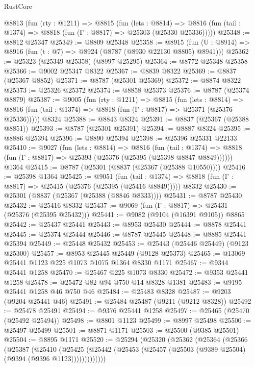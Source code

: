 \begin{lexlean}{RustCore}
\begin{coremodule}
  @8813
    (fun (rty : @1211) =>
    @8815
      (fun (lets : @8814) =>
      @8816 (fun (tail : @1374) => @8818 (fun (Γ : @8817) => @25303 (@25330 @25336)))))
@25348 := @8812 @25347
@25349 := @8809 @25348
@25358 := @8915
    (fun (U : @8914) => @8916 (fun (t : @7) => @8924 (@8787 (@8930 @22130 @8805) @8941)))
@25362 := @25323 (@25349 @25358) (@8997 @25295)
@25364 := @8772 @25348 @25358
@25366 := @9002 @25347 @8322
@25367 := @8839 @8322
@25369 := @8837 (@25367 @8852)
@25371 := @8787 (@25301 @25369)
@25372 := @8874 @8322
@25373 := @25326 @25372
@25374 := @8858 @25373
@25376 := @8787 (@25374 @8879)
@25387 := @9005
    (fun (rty : @1211) =>
    @8815
      (fun (lets : @8814) =>
      @8816 (fun (tail : @1374) => @8818 (fun (Γ : @8817) => @25371 (@25376 @25336)))))
    @8324
@25388 := @8843 @8324
@25391 := @8837 (@25367 (@25388 @8851))
@25393 := @8787 (@25301 @25391)
@25394 := @8887 @8324
@25395 := @8886 @25394
@25396 := @8890 @25394
@25398 := @25396 @25331 @22133
@25410 := @9027
    (fun (lets : @8814) =>
    @8816
      (fun (tail : @1374) =>
      @8818 (fun (Γ : @8817) => @25393 (@25376 (@25395 (@25398 @8847 @8849))))))
    @1364
@25415 := @8787 (@25301 (@8837 (@25367 (@25388 @10550))))
@25416 := @25398 @1364
@25425 := @9051
    (fun (tail : @1374) => @8818 (fun (Γ : @8817) => @25415 (@25376 (@25395 (@25416 @8849)))))
    @8332
@25430 := @25301 (@8837 (@25367 (@25388 (@8846 @8333))))
@25431 := @8787 @25430
@25432 := @25416 @8332
@25437 := @9069 (fun (Γ : @8817) => @25431 (@25376 (@25395 @25432)))
@25441 := @9082 (@9104 (@16391 @9105)) @8865
@25442 := @25437 @25441
@25443 := @8953 @25430
@25444 := @8878 @25441
@25445 := @25374 @25444
@25446 := @8787 @25445
@25448 := @8885 @25441 @25394
@25449 := @25448 @25432
@25453 := @25443 (@25446 @25449) (@9123 @25300)
@25457 := @8953 @25445 @25449 (@9128 @25373)
@25465 := @13069 @25441 @1123 @225 @1073 @1075 @1364 @8330 @1171
@25467 := @9344 @25441 @1258
@25470 := @25467 @225 @1073 @8330
@25472 := @9353 @25441 @1258
@25478 := @25472 @82 @94 @750 @14 @8328 @1381
@25483 := @9195 @25441 @1258 @46 @750 @46
@25484 := @25483 @8328
@25487 := @9203 (@9204 @25441 @46)
@25491 := @25484 @25487 (@9211 (@9212 @8328))
@25492 := @25478 @25491
@25494 := @9376 @25441 @1258
@25497 := @25465 (@25470 (@25492 @25494))
@25498 := @8801 @1123
@25499 := @8997 @25498
@25500 := @25497 @25499
@25501 := @8871 @1171
@25503 := @25500 (@9385 @25501)
@25504 := @8895 @1171
@25520 := @25294
    (@25320
      (@25362
        (@25364
          (@25366
            (@25387
              (@25410
                (@25425
                  (@25442 (@25453 (@25457 (@25503 (@9389 @25504) (@9394 (@9396 @1123)))))))))))))

\end{coremodule}
\end{lexlean}
